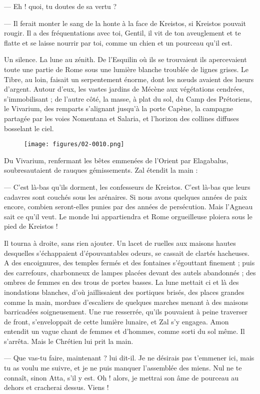\documentclass[a4paper, 11pt, oneside, polutonikogreek, french]{article}
\begin{document}
--- Eh ! quoi, tu doutes de sa vertu ?

--- Il ferait monter le sang de la honte à la face de Kreistos, si Kreistos pouvait rougir. Il a des fréquentations avec toi, Gentil, il vit de ton aveuglement et te flatte et se laisse nourrir par toi, comme un chien et un pourceau qu'il est.

Un silence. La lune au zénith. De l'Esquilin où ils se trouvaient ils apercevaient toute une partie de Rome sous une lumière blanche troublée de lignes grises. Le Tibre, au loin, faisait un serpentement énorme, dont les nœuds avaient des lueurs d'argent. Autour d'eux, les vastes jardins de Mécène aux végétations cendrées, s'immobilisant ; de l'autre côté, la masse, à plat du sol, du Camp des Prétoriens, le Vivarium, des remparts s'alignant jusqu'à la porte Capène, la campagne partagée par les voies Nomentana et Salaria, et l'horizon des collines diffuses bosselant le ciel.
\begin{figure}[H]
\centering
\texttt{[image: figures/02-0010.png]}
\end{figure}
Du Vivarium, renfermant les bêtes emmenées de l'Orient par Elagabalus, soubresautaient de rauques gémissements. Zal étendit la main :

--- C'est là-bas qu'ils dorment, les confesseurs de Kreistos. C'est là-bas que leurs cadavres sont couchés sous les arénaires. Si nous avons quelques années de paix encore, combien seront-elles punies par des années de persécution. Mais l'Agneau sait ce qu'il veut. Le monde lui appartiendra et Rome orgueilleuse ploiera sous le pied de Kreistos !

Il tourna à droite, sans rien ajouter. Un lacet de ruelles aux maisons hautes desquelles s'échappaient d'épouvantables odeurs, se cassait de clartés hacheuses. A des encoignures, des temples fermés et des fontaines s'égouttant finement ; puis des carrefours, charbonneux de lampes placées devant des autels abandonnés ; des ombres de femmes en des trous de portes basses. La lune mettait ci et là des inondations blanches, d'où jaillissaient des portiques brisés, des places grandes comme la main, mordues d'escaliers de quelques marches menant à des maisons barricadées soigneusement. Une rue resserrée, qu'ils pouvaient à peine traverser de front, s'enveloppait de cette lumière lunaire, et Zal s'y engagea. Amon entendit un vague chant de femmes et d'hommes, comme sorti du sol même. Il s'arrêta. Mais le Chrétien lui prit la main.

--- Que vas-tu faire, maintenant ? lui dit-il. Je ne désirais pas t'emmener ici, mais tu as voulu me suivre, et je ne puis manquer l'assemblée des miens. Nul ne te connaît, sinon Atta, s'il y est. Oh ! alors, je mettrai son âme de pourceau au dehors et cracherai dessus. Viens !
\end{document}
